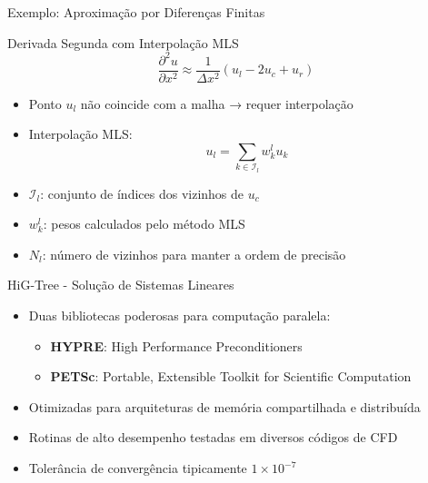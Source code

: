 \documentclass[../main/main.tex]{subfiles}
\begin{document}
\begin{frame}{Exemplo: Aproximação por Diferenças Finitas}
  \begin{block}{Derivada Segunda com Interpolação MLS}
    \[
      \frac{\partial^{2}u}{\partial x^{2}} \approx \frac{1}{\Delta x^{2}}(u_{l} - 2u_{c} + u_{r})
    \]
  \end{block}
  \begin{itemize}
    \item Ponto $u_{l}$ não coincide com a malha → requer interpolação
    \item Interpolação MLS:
      \[
        u_{l} = \sum_{k \in \mathcal{I}_{l}} w^{l}_{k} u_{k}
      \]
    \item $\mathcal{I}_{l}$: conjunto de índices dos vizinhos de $u_{c}$
    \item $w^{l}_{k}$: pesos calculados pelo método MLS
    \item $N_{l}$: número de vizinhos para manter a ordem de precisão
  \end{itemize}
\end{frame}

\begin{frame}{HiG-Tree - Solução de Sistemas Lineares}
  \begin{itemize}
    \item Duas bibliotecas poderosas para computação paralela:
      \begin{itemize}
        \item \textbf{HYPRE}: High Performance Preconditioners
        \item \textbf{PETSc}: Portable, Extensible Toolkit for Scientific Computation
      \end{itemize}
    \item Otimizadas para arquiteturas de memória compartilhada e distribuída
    \item Rotinas de alto desempenho testadas em diversos códigos de CFD
    \item Tolerância de convergência tipicamente $1 \times 10^{-7}$
  \end{itemize}
\end{frame}
\end{document}
